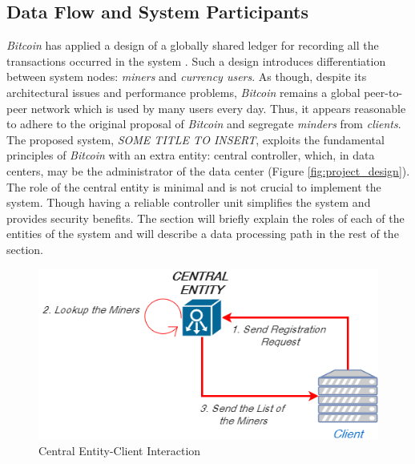 \documentclass{article}
\newcommand{\projTitle}{SOME TITLE TO INSERT\xspace}
\begin{document}
\subsection{Data Flow and System Participants}
 \textit{Bitcoin} has applied a design of a globally shared ledger for recording all the transactions occurred in the system \cite{bitcoin_paper}. Such a design introduces differentiation between system nodes: \textit{miners} and \textit{currency users}. As though, despite its architectural issues and performance problems, \textit{Bitcoin} remains a global peer-to-peer network which is used by many users every day. Thus, it appears reasonable to adhere to the original proposal of \textit{Bitcoin} and segregate \textit{minders} from \textit{clients}. The proposed system, \textit{\projTitle}, exploits the fundamental principles of \textit{Bitcoin} with an extra entity: central controller, which, in data centers, may be the administrator of the data center (Figure \ref{fig:project_design}). The role of the central entity is minimal and is not crucial to implement the system. Though having a reliable controller unit simplifies the system and provides security benefits. The section will briefly explain the roles of each of the entities of the system and will describe a data processing path in the rest of the section.

\begin{figure}[h]
  \includegraphics[width=0.5\linewidth]{figures/central_entity_client_reg.png}
  \caption{Central Entity-Client Interaction}
  \label{fig:central_entity_client_reg}
\end{figure}
\end{document}
